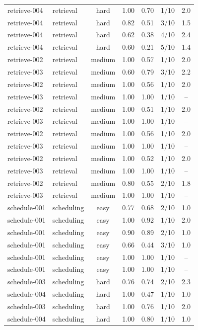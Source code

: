 \begin{table}[t]
\begin{tabular}{llccccc}
retrieve-004 & retrieval & hard & 1.00 & 0.70 & 1/10 & 2.0 \\
retrieve-004 & retrieval & hard & 0.82 & 0.51 & 3/10 & 1.5 \\
retrieve-004 & retrieval & hard & 0.62 & 0.38 & 4/10 & 2.4 \\
retrieve-004 & retrieval & hard & 0.60 & 0.21 & 5/10 & 1.4 \\
retrieve-002 & retrieval & medium & 1.00 & 0.57 & 1/10 & 2.0 \\
retrieve-003 & retrieval & medium & 0.60 & 0.79 & 3/10 & 2.2 \\
retrieve-002 & retrieval & medium & 1.00 & 0.56 & 1/10 & 2.0 \\
retrieve-003 & retrieval & medium & 1.00 & 1.00 & 1/10 & -- \\
retrieve-002 & retrieval & medium & 1.00 & 0.51 & 1/10 & 2.0 \\
retrieve-003 & retrieval & medium & 1.00 & 1.00 & 1/10 & -- \\
retrieve-002 & retrieval & medium & 1.00 & 0.56 & 1/10 & 2.0 \\
retrieve-003 & retrieval & medium & 1.00 & 1.00 & 1/10 & -- \\
retrieve-002 & retrieval & medium & 1.00 & 0.52 & 1/10 & 2.0 \\
retrieve-003 & retrieval & medium & 1.00 & 1.00 & 1/10 & -- \\
retrieve-002 & retrieval & medium & 0.80 & 0.55 & 2/10 & 1.8 \\
retrieve-003 & retrieval & medium & 1.00 & 1.00 & 1/10 & -- \\
schedule-001 & scheduling & easy & 0.77 & 0.68 & 2/10 & 1.0 \\
schedule-001 & scheduling & easy & 1.00 & 0.92 & 1/10 & 2.0 \\
schedule-001 & scheduling & easy & 0.90 & 0.89 & 2/10 & 1.0 \\
schedule-001 & scheduling & easy & 0.66 & 0.44 & 3/10 & 1.0 \\
schedule-001 & scheduling & easy & 1.00 & 1.00 & 1/10 & -- \\
schedule-001 & scheduling & easy & 1.00 & 1.00 & 1/10 & -- \\
schedule-003 & scheduling & hard & 0.76 & 0.74 & 2/10 & 2.3 \\
schedule-004 & scheduling & hard & 1.00 & 0.47 & 1/10 & 1.0 \\
schedule-003 & scheduling & hard & 1.00 & 0.76 & 1/10 & 2.0 \\
schedule-004 & scheduling & hard & 1.00 & 0.80 & 1/10 & 1.0 \\

\end{tabular}
\end{table}

